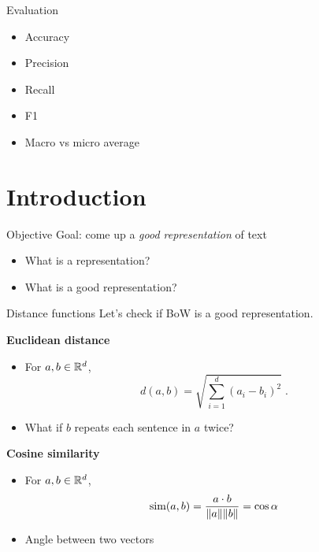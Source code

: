 \documentclass[usenames,dvipsnames,notes]{beamer}
\begin{document}
\begin{frame}
    {Evaluation}
    \begin{itemize}
        \itemsep3em
        \item Accuracy
        \item Precision
        \item Recall 
        \item F1
        \item Macro vs micro average
    \end{itemize}
\end{frame}

\section{Introduction}

\begin{frame}
    {Objective}    
    Goal: come up a \emph{good representation} of text\\
    \begin{itemize}
        \itemsep5em
        \item What is a representation?
        \item What is a good representation?
    \end{itemize}
    \vspace{3em}

\end{frame}

\begin{frame}
    {Distance functions}
    Let's check if BoW is a good representation.

    \textbf{Euclidean distance}\\
    \begin{itemize}
        \item[] For $a,b\in\mathbb{R}^d$,
            $$
            d(a,b) = \sqrt{\sum_{i=1}^d(a_i-b_i)^2} \;.
            $$
        \item[] What if $b$ repeats each sentence in $a$ twice?
    \end{itemize}

    \pause
    \textbf{Cosine similarity}\\
    \begin{itemize}
        \item[] For $a,b\in\mathbb{R}^d$,
            $$
            \text{sim}(a,b) = \frac{a\cdot b}{\|a\|\|b\|} = \cos\alpha
            $$
        \item[] Angle between two vectors
    \end{itemize}
\end{frame}
\end{document}

